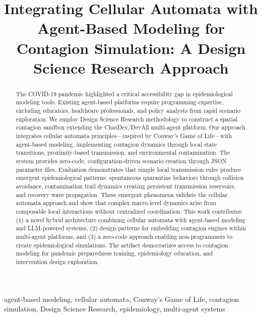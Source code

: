 \documentclass[conference]{IEEEtran}
\begin{document}
\title{Integrating Cellular Automata with Agent-Based Modeling for Contagion Simulation: A Design Science Research Approach}

\author{
}

\maketitle

\begin{abstract}
The COVID-19 pandemic highlighted a critical accessibility gap in epidemiological modeling tools. Existing agent-based platforms require programming expertise, excluding educators, healthcare professionals, and policy analysts from rapid scenario exploration. We employ Design Science Research methodology to construct a spatial contagion sandbox extending the ChatDev/DevAll multi-agent platform. Our approach integrates cellular automata principles---inspired by Conway's Game of Life---with agent-based modeling, implementing contagion dynamics through local state transitions, proximity-based transmission, and environmental contamination. The system provides zero-code, configuration-driven scenario creation through JSON parameter files. Evaluation demonstrates that simple local transmission rules produce emergent epidemiological patterns: spontaneous quarantine behaviors through collision avoidance, contamination trail dynamics creating persistent transmission reservoirs, and recovery wave propagation. These emergent phenomena validate the cellular automata approach and show that complex macro-level dynamics arise from composable local interactions without centralized coordination. This work contributes: (1) a novel hybrid architecture combining cellular automata with agent-based modeling and LLM-powered systems, (2) design patterns for embedding contagion engines within multi-agent platforms, and (3) a zero-code approach enabling non-programmers to create epidemiological simulations. The artifact democratizes access to contagion modeling for pandemic preparedness training, epidemiology education, and intervention design exploration.
\end{abstract}

\begin{IEEEkeywords}
agent-based modeling, cellular automata, Conway's Game of Life, contagion simulation, Design Science Research, epidemiology, multi-agent systems
\end{IEEEkeywords}
\end{document}
